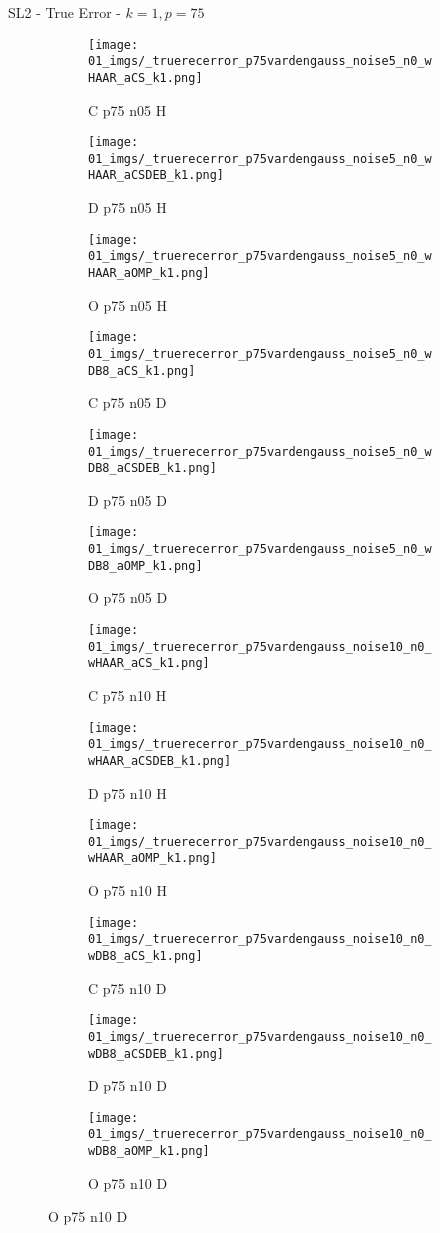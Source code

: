 \begin{frame}{SL2 - True Error - $k=1,p=75$}{}
\begin{figure}
\begin{subfigure}{0.13\textwidth}
\texttt{[image: 01\_imgs/\_truerecerror\_p75vardengauss\_noise5\_n0\_wHAAR\_aCS\_k1.png]}
\caption*{\tiny C p75 n05 H}
\end{subfigure}
\begin{subfigure}{0.13\textwidth}
\texttt{[image: 01\_imgs/\_truerecerror\_p75vardengauss\_noise5\_n0\_wHAAR\_aCSDEB\_k1.png]}
\caption*{\tiny D p75 n05 H}
\end{subfigure}
\begin{subfigure}{0.13\textwidth}
\texttt{[image: 01\_imgs/\_truerecerror\_p75vardengauss\_noise5\_n0\_wHAAR\_aOMP\_k1.png]}
\caption*{\tiny O p75 n05 H}
\end{subfigure}
\begin{subfigure}{0.13\textwidth}
\texttt{[image: 01\_imgs/\_truerecerror\_p75vardengauss\_noise5\_n0\_wDB8\_aCS\_k1.png]}
\caption*{\tiny C p75 n05 D}
\end{subfigure}
\begin{subfigure}{0.13\textwidth}
\texttt{[image: 01\_imgs/\_truerecerror\_p75vardengauss\_noise5\_n0\_wDB8\_aCSDEB\_k1.png]}
\caption*{\tiny D p75 n05 D}
\end{subfigure}
\begin{subfigure}{0.13\textwidth}
\texttt{[image: 01\_imgs/\_truerecerror\_p75vardengauss\_noise5\_n0\_wDB8\_aOMP\_k1.png]}
\caption*{\tiny O p75 n05 D}
\end{subfigure}

\vspace{5pt}

\begin{subfigure}{0.13\textwidth}
\texttt{[image: 01\_imgs/\_truerecerror\_p75vardengauss\_noise10\_n0\_wHAAR\_aCS\_k1.png]}
\caption*{\tiny C p75 n10 H}
\end{subfigure}
\begin{subfigure}{0.13\textwidth}
\texttt{[image: 01\_imgs/\_truerecerror\_p75vardengauss\_noise10\_n0\_wHAAR\_aCSDEB\_k1.png]}
\caption*{\tiny D p75 n10 H}
\end{subfigure}
\begin{subfigure}{0.13\textwidth}
\texttt{[image: 01\_imgs/\_truerecerror\_p75vardengauss\_noise10\_n0\_wHAAR\_aOMP\_k1.png]}
\caption*{\tiny O p75 n10 H}
\end{subfigure}
\begin{subfigure}{0.13\textwidth}
\texttt{[image: 01\_imgs/\_truerecerror\_p75vardengauss\_noise10\_n0\_wDB8\_aCS\_k1.png]}
\caption*{\tiny C p75 n10 D}
\end{subfigure}
\begin{subfigure}{0.13\textwidth}
\texttt{[image: 01\_imgs/\_truerecerror\_p75vardengauss\_noise10\_n0\_wDB8\_aCSDEB\_k1.png]}
\caption*{\tiny D p75 n10 D}
\end{subfigure}
\begin{subfigure}{0.13\textwidth}
\texttt{[image: 01\_imgs/\_truerecerror\_p75vardengauss\_noise10\_n0\_wDB8\_aOMP\_k1.png]}
\caption*{\tiny O p75 n10 D}
\end{subfigure}


\end{figure}
\end{frame}

